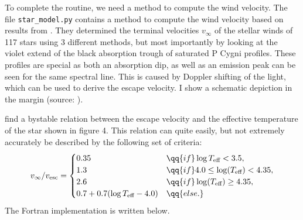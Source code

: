 \documentclass[a4paper,10pt]{article}
\begin{document}
To complete the routine, we need a method to compute the wind velocity. The file \lstinline[style=output, breaklines=true]|star_model.py| contains a method to compute the wind velocity based on results from \citet{lamers1995}. They determined the terminal velocities \(v_{\infty}\) of the stellar winds of 117 stars using 3 different methods, but most importantly by looking at the violet extend of the black absorption trough of saturated P Cygni profiles. These profiles are special as both an absorption dip, as well as an emission peak can be seen for the same spectral line. This is caused by Doppler shifting of the light, which can be used to derive the escape velocity. I show a schematic depiction in the margin (source: \citet{wikimedia2024}).

\citet{lamers1995} find a bystable relation between the escape velocity and the effective temperature of the star shown in figure 4. This relation can quite easily, but not extremely accurately be described by the following set of criteria:
\begin{equation*}
    v_{\infty } / v_\text{esc} = \begin{cases}
        0.35 &\qq{if} \log T_\text{eff} < 3.5,\\
        1.3 &\qq{if} 4.0 \leq \log(T_\text{eff}) < 4.35,\\
        2.6 &\qq{if} \log(T_\text{eff}) \geq 4.35,\\
        0.7 + 0.7 (\log T_\text{eff} - 4.0) &\qq{else.}
\end{cases}
\end{equation*}
The Fortran implementation is written below.
\end{document}
